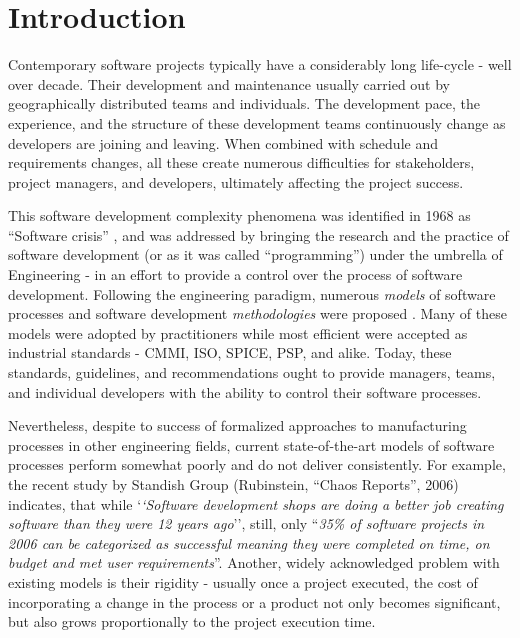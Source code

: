 \chapter{Introduction}
Contemporary software projects typically have a considerably long life-cycle - well over decade.
Their development and maintenance usually carried out by geographically distributed teams 
and individuals. The development pace, the experience, and the structure of these development 
teams continuously change as developers are joining and leaving. When combined with
schedule and requirements changes, all these create numerous difficulties for stakeholders,
project managers, and developers, ultimately affecting the project success. 

This software development complexity phenomena was identified in 1968 as ``Software crisis'' \cite{crisis}, 
and was addressed by bringing the research and the practice of software development 
(or as it was called ``programming'') under the umbrella of Engineering  - in an effort to provide a 
control over the process of software development. 
Following the engineering paradigm, numerous \textit{models} of software processes 
and software development \textit{methodologies} were proposed \cite{citeulike:10002165}.
Many of these models were adopted by practitioners while most efficient were accepted as industrial 
standards - CMMI, ISO, SPICE, PSP, and alike. 
Today, these standards, guidelines, and recommendations ought to 
provide managers, teams, and individual developers with the ability to control their software processes.

Nevertheless, despite to success of formalized approaches to manufacturing processes in other 
engineering fields, current state-of-the-art models of software processes perform somewhat poorly 
and do not deliver consistently. 
For example, the recent study by Standish Group (Rubinstein, ``Chaos Reports'', 2006) indicates,
that while `\textit{`Software development shops are doing a better job creating software than they were 
12 years ago}'', still, only ``\textit{35\% of software projects in 2006 can be categorized 
as successful meaning they were completed on time, on budget and met user requirements}”.
Another, widely acknowledged problem with existing models is their rigidity - usually 
once a project executed, the cost of incorporating a change in the process or a product 
not only becomes significant, but also grows proportionally to the project execution time.

